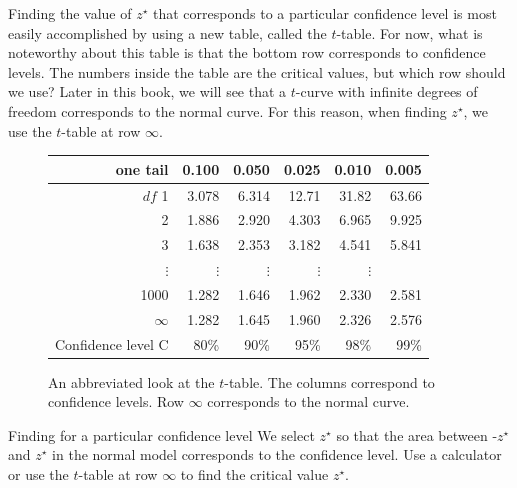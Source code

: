 Finding the value of $z^{\star}$ that corresponds to a particular confidence level is most easily accomplished by using a new table, called the $t$-table. For now, what is noteworthy about this table is that the bottom row corresponds to confidence levels. The numbers inside the table are the critical values, but which row should we use? Later in this book, we will see that a $t$-curve with infinite degrees of freedom corresponds to the normal curve. For this reason, when finding $z^{\star}$, we use the $t$-table at row $\infty$.

\begin{figure}[hht]
\centering
\begin{tabular}{r | rrr rr}
one tail & \hspace{1.5mm}  0.100 & \hspace{1.5mm} 0.050 & \hspace{1.5mm} 0.025 & \hspace{1.5mm} 0.010 & \hspace{1.5mm} 0.005  \\
\hline
{$df$} \hfill 1  &  {\normalsize  3.078} & {\normalsize  6.314} & {\normalsize 12.71} & {\normalsize 31.82} & {\normalsize 63.66}  \\ 
2  &  {\normalsize  1.886} & {\normalsize  2.920} & {\normalsize  4.303} & {\normalsize  6.965} & {\normalsize  9.925}  \\ 
3  &  {\normalsize  1.638} & {\normalsize  2.353} & {\normalsize  3.182} & {\normalsize  4.541} & {\normalsize  5.841}  \\ 
$\vdots$ & $\vdots$ &$\vdots$ &$\vdots$ &$\vdots$ & \\
1000  &  {\normalsize  1.282} & {\normalsize  1.646} & {\normalsize  1.962} & {\normalsize  2.330} & {\normalsize  2.581}  \\ 
$\infty$   &  {\normalsize  1.282} & {\normalsize  1.645} & {\normalsize  1.960} & {\normalsize  2.326} & {\normalsize  2.576}   \\
\hline
Confidence level C  &  {\normalsize  80\%} & {\normalsize 90\%} & {\normalsize 95\%} & {\normalsize  98\%} & {\normalsize  99\%}  \\
\hline
\end{tabular}
\caption{An abbreviated look at the $t$-table. The columns correspond to confidence levels. Row $\infty$ corresponds to the normal curve.}
\label{tTableSample}
\end{figure}


\begin{onebox}{Finding for a particular confidence level}
We select $z^{\star}$ so that the area between -$z^{\star}$ and $z^{\star}$ in the normal model corresponds to the confidence level. Use a calculator or use the $t$-table at row $\infty$ to find the critical value $z^{\star}$.\end{onebox}

